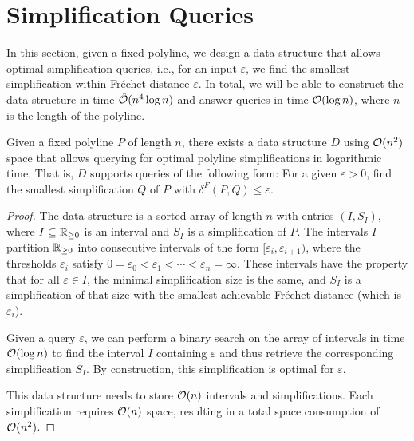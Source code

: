 \section{Simplification Queries}
\label{sec:simplification-queries}

In this section, given a fixed polyline, we design a data structure that allows optimal simplification queries, i.e., for an input \(\varepsilon\), we find the smallest simplification within Fréchet distance \(\varepsilon\). In total, we will be able to construct the data structure in time \(\hat{\mathcal{O}}(n^4\log n)\) and answer queries in time \(\mathcal{O}(\log n)\), where \(n\) is the length of the polyline.

\begin{lemma}\label{lem:datastructure-existence}
  Given a fixed polyline \(P\) of length \(n\), there exists a data structure \(D\) using \(\mathcal{O}(n^2)\) space that allows querying for optimal polyline simplifications in logarithmic time. That is, \(D\) supports queries of the following form: For a given \(\varepsilon > 0\), find the smallest simplification \(Q\) of \(P\) with \(\delta^F(P, Q) \leq \varepsilon\).
\end{lemma}

\begin{proof}
	The data structure is a sorted array of length \(n\) with entries \((I, S_I)\), where \(I \subseteq \mathbb{R}_{\geq 0}\) is an interval and \(S_I\) is a simplification of \(P\). The intervals \(I\) partition \(\mathbb{R}_{\geq 0}\) into consecutive intervals of the form \([\varepsilon_i, \varepsilon_{i+1})\), where the thresholds \(\varepsilon_i\) satisfy \(0 = \varepsilon_0 < \varepsilon_1 < \cdots < \varepsilon_{n} = \infty\). These intervals have the property that for all \(\varepsilon \in I\), the minimal simplification size is the same, and \(S_I\) is a simplification of that size with the smallest achievable Fréchet distance (which is \(\varepsilon_i\)).

	Given a query \(\varepsilon\), we can perform a binary search on the array of intervals in time \(\mathcal{O}(\log n)\) to find the interval \(I\) containing \(\varepsilon\) and thus retrieve the corresponding simplification \(S_I\). By construction, this simplification is optimal for \(\varepsilon\).

	This data structure needs to store \(\mathcal{O}(n)\) intervals and simplifications. Each simplification requires \(\mathcal{O}(n)\) space, resulting in a total space consumption of \(\mathcal{O}(n^2)\).
\end{proof}

